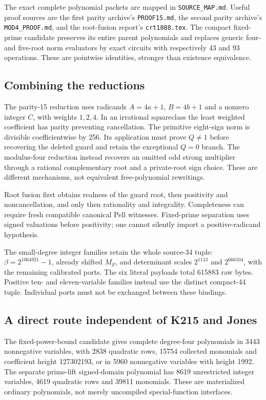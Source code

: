 The exact complete polynomial packets are mapped in
\texttt{SOURCE\_MAP.md}.  Useful proof sources are the first parity
archive's \texttt{PROOF15.md}, the second parity archive's
\texttt{MOD4\_PROOF.md}, and the root-fusion report's
\texttt{crt1088.tex}.  The compact fixed-prime candidate preserves its
entire parent polynomials and replaces generic four- and five-root norm
evaluators by exact circuits with respectively 43 and 93 operations.
These are pointwise identities, stronger than existence equivalence.

\subsection{Combining the reductions}
The parity-15 reduction uses radicands $A=4a+1$, $B=4b+1$ and a nonzero
integer $C$, with weights $1,2,4$.  In an irrational squareclass the
least weighted coefficient has parity preventing cancellation.  The
primitive eight-sign norm is divisible coefficientwise by 256.
Its application must prove $Q\ne1$ before recovering the deleted guard
and retain the exceptional $Q=0$ branch.  The modulus-four reduction
instead recovers an omitted odd strong multiplier through a rational
complementary root and a private-root sign choice.  These are different
mechanisms, not equivalent free-polynomial rewritings.

Root fusion first obtains realness of the guard root, then positivity
and noncancellation, and only then rationality and integrality.
Completeness can require fresh compatible canonical Pell witnesses.
Fixed-prime separation uses signed valuations before positivity;
one cannot silently import a positive-radicand hypothesis.

The small-degree integer families retain the whole source-34 tuple:
$\beta=2^{1064921}-1$, already shifted $M_F$, and determinant scales
$2^{1113}$ and $2^{666104}$, with the remaining calibrated ports.
The six literal payloads total 615883 raw bytes.  Positive ten- and
eleven-variable families instead use the distinct compact-44 tuple.
Individual ports must not be exchanged between these bindings.

\subsection{A direct route independent of K215 and Jones}
The fixed-power-bound candidate gives complete degree-four polynomials
in 3443 nonnegative variables, with 2838 quadratic rows, 15754 collected
monomials and coefficient height 127302193, or in 5960 nonnegative
variables with height 1992.  The separate prime-lift signed-domain
polynomial has 8619 unrestricted integer variables, 4619 quadratic
rows and 39811 monomials.  These are materialized ordinary polynomials,
not merely uncompiled special-function interfaces.

